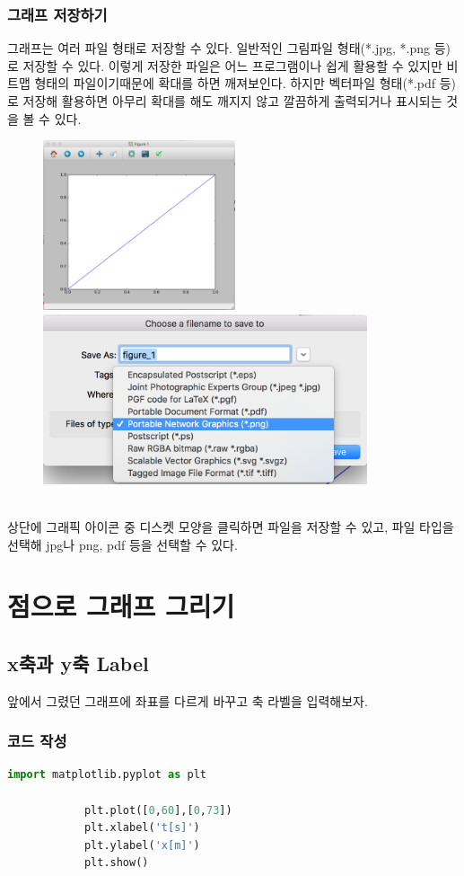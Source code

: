 \documentclass[12pt]{article}
\begin{document}
			\subsubsection{그래프 저장하기}
				그래프는 여러 파일 형태로 저장할 수 있다. 일반적인 그림파일 형태(*.jpg, *.png 등)로 저장할 수 있다. 이렇게 저장한 파일은 어느 프로그램이나 쉽게 활용할 수 있지만 비트맵 형태의 파일이기때문에 확대를 하면 깨져보인다. 하지만 벡터파일 형태(*.pdf 등)로 저장해 활용하면 아무리 확대를 해도 깨지지 않고 깔끔하게 출력되거나 표시되는 것을 볼 수 있다.
				\begin{figure}[h]
					\begin{center}
						\includegraphics[height=5cm]{./images/3_3_a.png}
						\includegraphics[height=5cm]{./images/3_3_b.png}
					\end{center}
				\end{figure}
				\\ 상단에 그래픽 아이콘 중 디스켓 모양을 클릭하면 파일을 저장할 수 있고, 파일 타입을 선택해 jpg나 png, pdf 등을 선택할 수 있다.
			
	\section{점으로 그래프 그리기}
		\subsection{x축과 y축 Label}
			앞에서 그렸던 그래프에 좌표를 다르게 바꾸고 축 라벨을 입력해보자.
			\subsubsection{코드 작성}
			\begin{lstlisting}[style=pstyle, language=Python, caption=axis label]
			import matplotlib.pyplot as plt
			
			plt.plot([0,60],[0,73])
			plt.xlabel('t[s]')
			plt.ylabel('x[m]')
			plt.show()\end{lstlisting}
\end{document}
